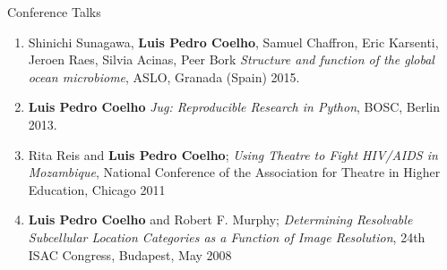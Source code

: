 \documentclass{article}
\renewcommand\subsection[1]{%
    \par\vspace{.1em}%
    {\hspace{1em}\subsubhead #1}%
    \par\vspace{.2em}%
}
\begin{document}
\subsection{Conference Talks}

\begin{enumerate}
\item Shinichi Sunagawa, \textbf{Luis Pedro Coelho}, Samuel Chaffron, Eric
Karsenti, Jeroen Raes, Silvia Acinas, Peer Bork \emph{Structure and function of
the global ocean microbiome}, ASLO, Granada (Spain) 2015.
\item \textbf{Luis Pedro Coelho} \emph{Jug: Reproducible Research in Python},
BOSC, Berlin 2013.
\item Rita Reis and \textbf{Luis Pedro Coelho}; \emph{Using Theatre to Fight
HIV/AIDS in Mozambique}, National Conference of the Association for Theatre in
Higher Education, Chicago 2011
\item \textbf{Luis Pedro Coelho} and Robert F. Murphy; \emph{Determining
Resolvable Subcellular Location Categories as a Function of Image Resolution},
24th ISAC Congress, Budapest, May 2008
\end{enumerate}
\end{document}
